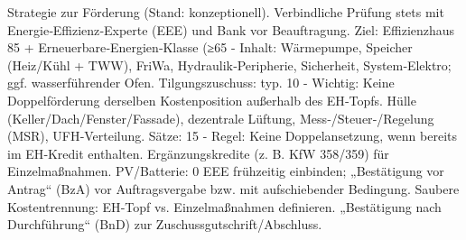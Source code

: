 \markdownRendererDocumentBegin
\markdownRendererSectionBegin
{}\markdownRendererInterblockSeparator
{}Strategie zur Förderung (Stand: konzeptionell). Verbindliche Prüfung stets mit Energie‑Effizienz‑Experte (EEE) und Bank vor Beauftragung.\markdownRendererInterblockSeparator
{}\markdownRendererSectionBegin
{}\markdownRendererInterblockSeparator
{}\markdownRendererUlBeginTight
\markdownRendererUlItem Ziel: Effizienzhaus 85 + Erneuerbare‑Energien‑Klasse (≥65 - Inhalt: Wärmepumpe, Speicher (Heiz/Kühl + TWW), FriWa, Hydraulik‑Peripherie, Sicherheit, System‑Elektro; ggf. wasserführender Ofen.\markdownRendererUlItemEnd 
\markdownRendererUlItem Tilgungszuschuss: typ. 10 - Wichtig: Keine Doppelförderung derselben Kostenposition außerhalb des EH‑Topfs.\markdownRendererUlItemEnd 
\markdownRendererUlEndTight \markdownRendererInterblockSeparator
{}
\markdownRendererSectionEnd \markdownRendererSectionBegin
{}\markdownRendererInterblockSeparator
{}\markdownRendererUlBeginTight
\markdownRendererUlItem Hülle (Keller/Dach/Fenster/Fassade), dezentrale Lüftung, Mess‑/Steuer‑/Regelung (MSR), UFH‑Verteilung.\markdownRendererUlItemEnd 
\markdownRendererUlItem Sätze: 15 - Regel: Keine Doppelansetzung, wenn bereits im EH‑Kredit enthalten.\markdownRendererUlItemEnd 
\markdownRendererUlEndTight \markdownRendererInterblockSeparator
{}
\markdownRendererSectionEnd \markdownRendererSectionBegin
{}\markdownRendererInterblockSeparator
{}\markdownRendererUlBeginTight
\markdownRendererUlItem Ergänzungskredite (z. B. KfW 358/359) für Einzelmaßnahmen.\markdownRendererUlItemEnd 
\markdownRendererUlItem PV/Batterie: 0 \markdownRendererUlItemEnd 
\markdownRendererUlEndTight \markdownRendererInterblockSeparator
{}
\markdownRendererSectionEnd \markdownRendererSectionBegin
{}\markdownRendererInterblockSeparator
{}\markdownRendererUlBeginTight
\markdownRendererUlItem EEE frühzeitig einbinden; „Bestätigung vor Antrag“ (BzA) vor Auftragsvergabe bzw. mit aufschiebender Bedingung.\markdownRendererUlItemEnd 
\markdownRendererUlItem Saubere Kostentrennung: EH‑Topf vs. Einzelmaßnahmen definieren.\markdownRendererUlItemEnd 
\markdownRendererUlItem „Bestätigung nach Durchführung“ (BnD) zur Zuschussgutschrift/Abschluss.\markdownRendererUlItemEnd 
\markdownRendererUlEndTight \markdownRendererInterblockSeparator
{}
\markdownRendererSectionEnd \markdownRendererSectionBegin
